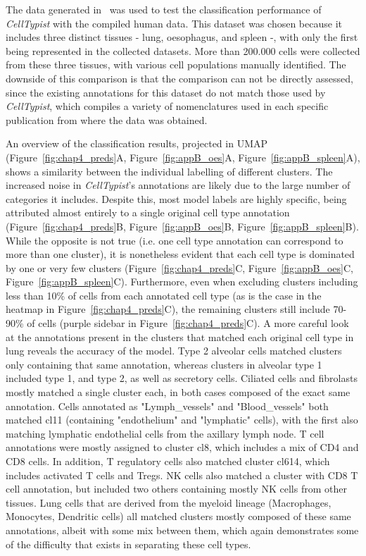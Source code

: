 The data generated in~\citep{madissoon_lung_2019} was used to test the classification performance of \textit{CellTypist} with the compiled human data. This dataset was chosen because it includes three distinct tissues - lung, oesophagus, and spleen -, with only the first being represented in the collected datasets. More than 200.000 cells were collected from these three tissues, with various cell populations manually identified. The downside of this comparison is that the comparison can not be directly assessed, since the existing annotations for this dataset do not match those used by \textit{CellTypist}, which compiles a variety of nomenclatures used in each specific publication from where the data was obtained.

An overview of the classification results, projected in UMAP~\citep{mcinnes_umap:_2018} (Figure~\ref{fig:chap4_preds}A, Figure~\ref{fig:appB_oes}A, Figure~\ref{fig:appB_spleen}A), shows a similarity between the individual labelling of different clusters. The increased noise in \textit{CellTypist}'s annotations are likely due to the large number of categories it includes. Despite this, most model labels are highly specific, being attributed almost entirely to a single original cell type annotation (Figure~\ref{fig:chap4_preds}B, Figure~\ref{fig:appB_oes}B, Figure~\ref{fig:appB_spleen}B). While the opposite is not true (i.e. one cell type annotation can correspond to more than one cluster), it is nonetheless evident that each cell type is dominated by one or very few clusters (Figure~\ref{fig:chap4_preds}C, Figure~\ref{fig:appB_oes}C, Figure~\ref{fig:appB_spleen}C). Furthermore, even when excluding clusters including less than 10\% of cells from each annotated cell type (as is the case in the heatmap in Figure~\ref{fig:chap4_preds}C), the remaining clusters still include 70-90\% of cells (purple sidebar in Figure~\ref{fig:chap4_preds}C). A more careful look at the annotations present in the clusters that matched each original cell type in lung reveals the accuracy of the model. Type 2 alveolar cells matched clusters only containing that same annotation, whereas clusters in alveolar type 1 included type 1, and type 2, as well as secretory cells. Ciliated cells and fibrolasts mostly matched a single cluster each, in both cases composed of the exact same annotation. Cells annotated as "Lymph\_vessels" and "Blood\_vessels" both matched cl11 (containing "endothelium" and "lymphatic" cells), with the first also matching lymphatic endothelial cells from the axillary lymph node. T cell annotations were mostly assigned to cluster cl8, which includes a mix of CD4 and CD8 cells. In addition, T regulatory cells also matched cluster cl614, which includes activated T cells and Tregs. NK cells also matched a cluster with CD8 T cell annotation, but included two others containing mostly NK cells from other tissues. Lung cells that are derived from the myeloid lineage (Macrophages, Monocytes, Dendritic cells) all matched clusters mostly composed of these same annotations, albeit with some mix between them, which again demonstrates some of the difficulty that exists in separating these cell types.

